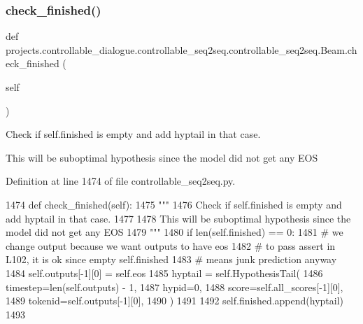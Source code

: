 \subsubsection{\texorpdfstring{check\+\_\+finished()}{check\_finished()}}
{\footnotesize\ttfamily def projects.\+controllable\+\_\+dialogue.\+controllable\+\_\+seq2seq.\+controllable\+\_\+seq2seq.\+Beam.\+check\+\_\+finished (\begin{DoxyParamCaption}\item[{}]{self }\end{DoxyParamCaption})}

\begin{DoxyVerb}Check if self.finished is empty and add hyptail in that case.

This will be suboptimal hypothesis since the model did not get any EOS
\end{DoxyVerb}
 

Definition at line 1474 of file controllable\+\_\+seq2seq.\+py.


\begin{DoxyCode}
1474     \textcolor{keyword}{def }check\_finished(self):
1475         \textcolor{stringliteral}{"""}
1476 \textcolor{stringliteral}{        Check if self.finished is empty and add hyptail in that case.}
1477 \textcolor{stringliteral}{}
1478 \textcolor{stringliteral}{        This will be suboptimal hypothesis since the model did not get any EOS}
1479 \textcolor{stringliteral}{        """}
1480         \textcolor{keywordflow}{if} len(self.finished) == 0:
1481             \textcolor{comment}{# we change output because we want outputs to have eos}
1482             \textcolor{comment}{# to pass assert in L102, it is ok since empty self.finished}
1483             \textcolor{comment}{# means junk prediction anyway}
1484             self.outputs[-1][0] = self.eos
1485             hyptail = self.HypothesisTail(
1486                 timestep=len(self.outputs) - 1,
1487                 hypid=0,
1488                 score=self.all\_scores[-1][0],
1489                 tokenid=self.outputs[-1][0],
1490             )
1491 
1492             self.finished.append(hyptail)
1493 
\end{DoxyCode}
\mbox{\label{classprojects_1_1controllable__dialogue_1_1controllable__seq2seq_1_1controllable__seq2seq_1_1Beam_a11a1f8185f11636128be8c25b1d2d56a}} 
